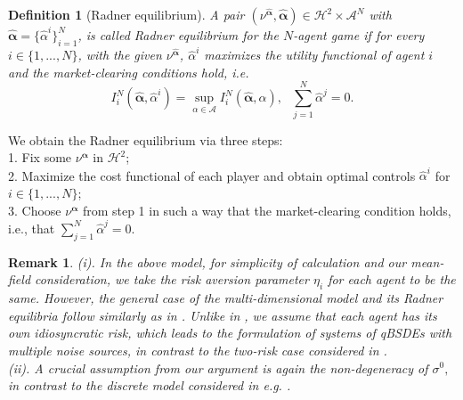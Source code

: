 \documentclass[10pt,a4paper]{article}
\newcommand{\MA}{{\mathcal{A}}}
\newcommand{\Balpha}{\boldsymbol{\alpha}}
\newcommand{\hBalpha}{\hat{\Balpha}}
\newcommand{\halpha}{{\hat{\alpha}}}
\theoremstyle{plain}
\newtheorem{Remark}[Theorem]{Remark}
\newtheorem{Definition}[Theorem]{Definition}
\theoremstyle{definition}
\numberwithin{equation}{section}
\begin{document}
\begin{Definition}[Radner equilibrium]
A pair $(\nu^{ \hat{\Balpha}},\hat{\Balpha}) \in \mathcal{H}^{2} \times \mathcal{A}^{N}$ with $\hat{\Balpha}=\{\halpha^i \}_{i=1}^N$, is called Radner equilibrium for the $N$-agent game if for every $i \in \{1,...,N\}$, with the given $\nu^{ \hat{\Balpha}}$, $\hat{\alpha}^{i}$ maximizes the utility functional of agent $i$ and the market-clearing conditions hold, i.e. 
$$
I^N_i(\hBalpha, \halpha^i)= \sup_{\alpha \in \MA}I^N_i(\hBalpha, \alpha), \ \ \ \sum_{j=1}^{N}\hat{\alpha}^{j} = 0.
$$

\end{Definition}

We obtain the Radner equilibrium via three steps:\\
1. Fix some $\nu^{ \Balpha}$ in $\mathcal{H}^{2}$; \\
2. Maximize the cost functional of each player and obtain optimal controls $\hat{\alpha}^{i}$ for $i \in \{1,...,N\}$; \\
3. Choose $\nu^{\Balpha}$ from step 1 in such a way that the market-clearing condition holds, i.e., that $\sum_{j=1}^{N}\hat{\alpha}^{j} = 0$.

\begin{Remark}
    

\textnormal{(i)}. In the above model, for simplicity of calculation and our mean-field consideration, we take the risk aversion parameter $\eta_i$ for each agent to be the same. However, the general case of the multi-dimensional model and its Radner equilibria follow similarly as in \cite{Kardaras2022}. Unlike in \cite{Kardaras2022}, we assume that each agent has its own idiosyncratic risk, which leads to the formulation of systems of qBSDEs with multiple noise sources, in contrast to the two-risk case considered in  \cite{Kardaras2022}.\\
\textnormal{(ii)}. A crucial assumption from our argument is again the non-degeneracy of $\sigma^0,$ in contrast to the discrete model considered in e.g. \cite{CHKP16}.

\end{Remark}

\end{document}
